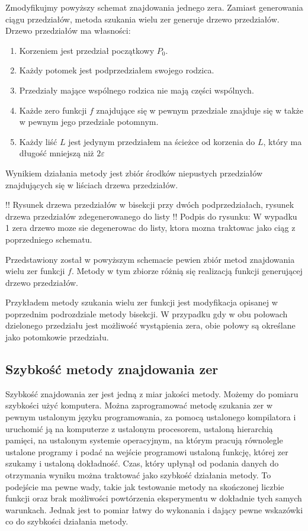 \documentclass{article}
\begin{document}
Zmodyfikujmy powyższy schemat znajdowania jednego zera. Zamiast generowania ciągu przedziałów, metoda szukania wielu zer generuje drzewo przedziałów. Drzewo przedziałów ma własności:
\begin{enumerate}
\item Korzeniem jest przedział początkowy $P_0$.
\item Każdy potomek jest podprzedziałem swojego rodzica.
\item Przedziały mające wspólnego rodzica nie mają części wspólnych.
\item Każde zero funkcji $f$ znajdujące się w pewnym przedziale znajduje się w także w pewnym jego przedziale potomnym.
\item Każdy liść $L$ jest jedynym przedziałem na ścieżce od korzenia do $L$, który ma długość mniejszą niż $2 \varepsilon$
\end{enumerate}

Wynikiem działania metody jest zbiór środków niepustych przedziałów znajdujących się w liściach drzewa przedziałów.

!! Rysunek drzewa przedziałów w bisekcji przy dwóch podprzedziałach, rysunek drzewa przedziałów zdegenerowanego do listy
!! Podpis do rysunku: W wypadku 1 zera drzewo moze sie degenerowac do listy, ktora mozna traktowac jako ciąg z poprzedniego schematu.

Przedstawiony został w powyższym schemacie pewien zbiór metod znajdowania wielu zer funkcji $f$. Metody w tym zbiorze różnią się realizacją funkcji generującej drzewo przedziałów.

Przykładem metody szukania wielu zer funkcji jest modyfikacja opisanej w poprzednim podrozdziale metody bisekcji. W przypadku gdy w obu połowach dzielonego przedziału jest możliwość wystąpienia zera, obie połowy są określane jako potomkowie przedziału.

\subsection{Szybkość metody znajdowania zer}

Szybkość znajdowania zer jest jedną z miar jakości metody. Możemy do pomiaru szybkości użyć komputera. Można zaprogramować metodę szukania zer w pewnym ustalonym języku programowania, za pomocą ustalonego kompilatora i uruchomić ją na komputerze z ustalonym procesorem, ustaloną hierarchią pamięci, na ustalonym systemie operacyjnym, na którym pracują równolegle ustalone programy i podać na wejście programowi ustaloną funkcję, której zer szukamy i ustaloną dokładność. Czas, który upłynął od podania danych do otrzymania wyniku można traktować jako szybkość działania metody. To podejście ma pewne wady, takie jak testowanie metody na skończonej liczbie funkcji oraz brak możliwości powtórzenia eksperymentu w dokładnie tych samych warunkach. Jednak jest to pomiar łatwy do wykonania i dający pewne wskazówki co do szybkości działania metody.
\end{document}
